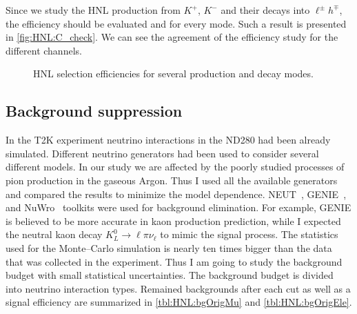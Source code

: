 \documentclass[../main.tex]{subfiles}
\begin{document}
Since we study the HNL production from $K^+$,  $K^-$ and their decays into $\ell^{\pm}h^{\mp}$, the efficiency should be evaluated and for every mode. Such a result is presented in \autoref{fig:HNL:C_check}. We can see the agreement of the efficiency study for the different channels.
\begin{figure}[!ht]
  \begin{minipage}{0.49\linewidth}
  \end{minipage}
  \hfill
  \begin{minipage}{0.49\linewidth}
  \end{minipage}
  \caption{HNL selection efficiencies for several production and decay modes.}
  \label{fig:HNL:C_check}
\end{figure}

\subsection{Background suppression}
\label{sec:HNL:bg}
In the T2K experiment neutrino interactions in the ND280 had been already simulated. Different neutrino generators had been used to consider several different models. In our study we are affected by the poorly studied processes of pion production in the gaseous Argon. Thus I used all the available generators and compared the results to minimize the model dependence. NEUT~\cite{Hayato2002}, GENIE~\cite{Andreopoulos2010}, and NuWro~\cite{Zmuda2015} toolkits were used for background elimination. For example, GENIE is believed to be more accurate in kaon production prediction, while I expected the neutral kaon decay $K^0_L\to\ell\pi\nu_\ell$ to mimic the signal process. The statistics used for the Monte--Carlo simulation is nearly ten times bigger than the data that was collected in the experiment. Thus I am going to study the background budget with small statistical uncertainties. The background budget is divided into neutrino interaction types. Remained backgrounds after each cut as well as a signal efficiency are summarized in \autoref{tbl:HNL:bgOrigMu} and \autoref{tbl:HNL:bgOrigEle}.
\end{document}
